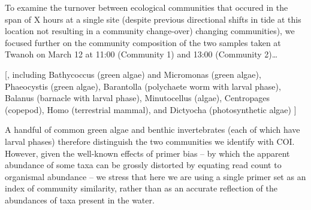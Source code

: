 \documentclass[fleqn,10pt,lineno]{wlpeerj} %
\begin{document}
To examine the turnover between ecological communities that occured in
the span of X hours at a single site (despite previous directional
shifts in tide at this location not resulting in a community
change-over) changing communities), we focused further on the community
composition of the two samples taken at Twanoh on March 12 at 11:00
(Community 1) and 13:00 (Community 2)\ldots{}

{[}, including Bathycoccus (green algae) and Micromonas (green algae),
Phaeocystis (green algae), Barantolla (polychaete worm with larval
phase), Balanus (barnacle with larval phase), Minutocellus (algae),
Centropages (copepod), Homo (terrestrial mammal), and Dictyocha
(photosynthetic algae) {]}

A handful of common green algae and benthic invertebrates (each of which
have larval phases) therefore distinguish the two communities we
identify with COI. However, given the well-known effects of primer bias
-- by which the apparent abundance of some taxa can be grossly distorted
by equating read count to organismal abundance -- we stress that here we
are using a single primer set as an index of community similarity,
rather than as an accurate reflection of the abundances of taxa present
in the water.
\end{document}
